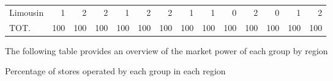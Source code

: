 \documentclass[11pt]{article}
\begin{document}
\begin{table}[H]
\begin{tabular}{lrrrrrrrrrrrrr}
Limousin             &          1 &          2 &          2 &          1 &          2 &          2 &          1 &          1 &          0 &          2 &          0 &          1 &          2 \\
TOT.                 &        100 &        100 &        100 &        100 &        100 &        100 &        100 &        100 &        100 &        100 &        100 &        100 &        100 \\
\bottomrule
\end{tabular}

\end{table}

The following table provides an overview of the market power of each group by region

\begin{table}[H]
\caption{Percentage of stores operated by each group in each region}
\footnotesize
\setlength{\tabcolsep}{2pt}


\end{table}
\end{document}
